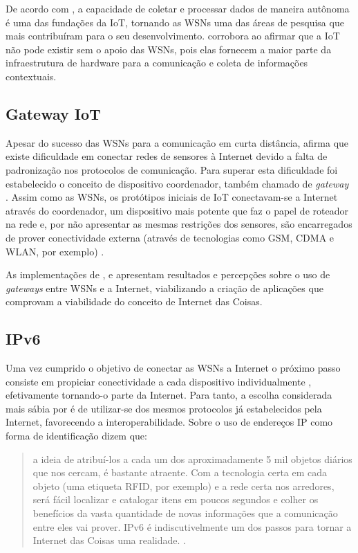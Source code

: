 \documentclass[twoside,english,brazilian]{UNISINOSmonografia}
\begin{document}
	De acordo com , a capacidade de coletar e processar 
	dados de maneira autônoma é uma das fundações da IoT, tornando as WSNs uma 
	das áreas de pesquisa que mais contribuíram para o seu desenvolvimento. 
	 corrobora ao afirmar que a IoT não pode existir sem 
	o apoio das WSNs, pois elas fornecem a maior parte da infraestrutura de 
	hardware para a comunicação e coleta de informações contextuais.

\subsection{Gateway IoT}
	Apesar do sucesso das WSNs para a comunicação em curta distância, 
	 afirma que existe dificuldade 
	em conectar redes de sensores à Internet devido a falta de padronização 
	nos protocolos de comunicação. Para superar esta dificuldade foi 
	estabelecido o conceito de dispositivo coordenador, também chamado de 
	\textit{gateway} \cite{Steenkamp2009}. 
	Assim como as WSNs, os protótipos iniciais de IoT conectavam-se a Internet 
	através do coordenador, um dispositivo mais potente que faz o papel de 
	roteador na rede \cite{Kuryla2010} e, por não apresentar as mesmas 
	restrições dos sensores, são encarregados de prover 
	conectividade externa (através de 
	tecnologias como GSM, CDMA e WLAN, por exemplo) \cite{Liu2012}.
	
	As implementações de ,  e 
	 apresentam resultados e percepções sobre o uso de 
	\textit{gateways} entre WSNs e a Internet, viabilizando a criação de 
	aplicações que comprovam a viabilidade do conceito de Internet das Coisas.

\subsection{IPv6}
	Uma vez cumprido o objetivo de conectar as WSNs a Internet o próximo passo 
	consiste em propiciar conectividade a cada dispositivo individualmente 
	\cite[p.~13]{Atzori2010b}, efetivamente tornando-o parte da Internet.
	Para tanto, a escolha considerada mais sábia por  
	é de utilizar-se dos mesmos protocolos já estabelecidos pela Internet, 
	favorecendo a interoperabilidade.
	Sobre o uso de endereços IP como forma de 
	identificação  dizem que:
	\begin{quote}
		a ideia de atribuí-los a cada um dos aproximadamente 5 
		mil objetos diários que nos cercam, é bastante atraente.
		Com a tecnologia certa em cada objeto (uma etiqueta RFID, por exemplo) 
		e a rede certa nos arredores, será fácil localizar e catalogar itens 
		em poucos segundos e colher os benefícios da vasta quantidade de novas 
		informações que a comunicação entre eles vai prover. IPv6 é 
		indiscutivelmente um dos passos para tornar a Internet das Coisas uma 
		realidade.
		\cite[p.~15]{Sundmaeker2010}.
	\end{quote}
	
\end{document}
